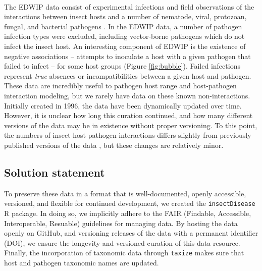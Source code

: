 \documentclass[12pt]{article}
\begin{document}
\paragraph*{}
The EDWIP data consist of experimental infections and field observations of the interactions between insect hosts and a number of nematode, viral, protozoan, fungal, and bacterial pathogens \citep{braxton2003}. In the EDWIP data, a number of pathogen infection types were excluded, including vector-borne pathogens which do not infect the insect host. An interesting component of EDWIP is the existence of negative associations -- attempts to inoculate a host with a given pathogen that failed to infect -- for some host groups (Figure \ref{fig:bubble}). Failed infections represent \textit{true} absences or incompatibilities between a given host and pathogen. These data are incredibly useful to pathogen host range and host-pathogen interaction modeling, but we rarely have data on these known non-interactions. Initially created in 1996, the data have been dynamically updated over time. However, it is unclear how long this curation continued, and how many different versions of the data may be in existence without proper versioning. To this point, the numbers of insect-host pathogen interactions differs slightly from previously published versions of the data \citep{braxton2003}, but these changes are relatively minor. 



\subsection*{Solution statement}

To preserve these data in a format that is well-documented, openly accessible, versioned, and flexible for continued development, we created the \texttt{insectDisease} R package. In doing so, we implicitly adhere to the FAIR (Findable, Accessible, Interoperable, Resuable) guidelines for managing data. By hosting the data openly on GitHub, and versioning releases of the data with a permanent identifier (DOI), we ensure the longevity and versioned curation of this data resource. Finally, the incorporation of taxonomic data through \texttt{taxize} \citep{chamberlain2013} makes sure that host and pathogen taxonomic names are updated. 
\end{document}
